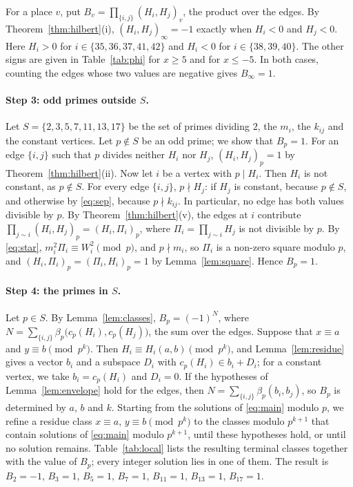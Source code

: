 \documentclass[11pt]{article}
\begin{document}
For a place $v$, put $B_v=\prod_{\{i,j\}}(H_i,H_j)_v$, the product over the edges. By Theorem~\ref{thm:hilbert}(i), $(H_i,H_j)_\infty=-1$ exactly when $H_i<0$ and $H_j<0$. Here $H_i>0$ for $i\in\{35,\allowbreak 36,\allowbreak 37,\allowbreak 41,\allowbreak 42\}$ and $H_i<0$ for $i\in\{38,\allowbreak 39,\allowbreak 40\}$. The other signs are given in Table~\ref{tab:phi} for $x\geq5$ and for $x\leq-5$. In both cases, counting the edges whose two values are negative gives $B_\infty=1$.

\paragraph{Step 3: odd primes outside $S$.} Let $S=\{2,3,5,7,11,13,17\}$ be the set of primes dividing $2$, the $m_{i}$, the $k_{ij}$ and the constant vertices. Let $p\notin S$ be an odd prime; we show that $B_p=1$. For an edge $\{i,j\}$ such that $p$ divides neither $H_i$ nor $H_j$, $(H_i,H_j)_p=1$ by Theorem~\ref{thm:hilbert}(ii). Now let $i$ be a vertex with $p\mid H_i$. Then $H_i$ is not constant, as $p\notin S$. For every edge $\{i,j\}$, $p\nmid H_j$: if $H_j$ is constant, because $p\notin S$, and otherwise by \eqref{eq:sep}, because $p\nmid k_{ij}$. In particular, no edge has both values divisible by $p$. By Theorem~\ref{thm:hilbert}(v), the edges at $i$ contribute $\prod_{j\sim i}(H_i,H_j)_p=(H_i,\Pi_i)_p$, where $\Pi_i=\prod_{j\sim i}H_j$ is not divisible by $p$. By \eqref{eq:star}, $m_i^2\Pi_i\equiv W_i^2\pmod p$, and $p\nmid m_i$, so $\Pi_i$ is a non-zero square modulo $p$, and $(H_i,\Pi_i)_p=(\Pi_i,H_i)_p=1$ by Lemma~\ref{lem:square}. Hence $B_p=1$.

\paragraph{Step 4: the primes in $S$.} Let $p\in S$. By Lemma~\ref{lem:classes}, $B_p=(-1)^{N}$, where $N=\sum_{\{i,j\}}\beta_p\bigl(c_p(H_i),c_p(H_j)\bigr)$, the sum over the edges. Suppose that $x\equiv a$ and $y\equiv b\pmod{p^k}$. Then $H_i\equiv H_i(a,b)\pmod{p^k}$, and Lemma~\ref{lem:residue} gives a vector $b_i$ and a subspace $D_i$ with $c_p(H_i)\in b_i+D_i$; for a constant vertex, we take $b_i=c_p(H_i)$ and $D_i=0$. If the hypotheses of Lemma~\ref{lem:envelope} hold for the edges, then $N=\sum_{\{i,j\}}\beta_p(b_i,b_j)$, so $B_p$ is determined by $a$, $b$ and $k$. Starting from the solutions of \eqref{eq:main} modulo $p$, we refine a residue class $x\equiv a$, $y\equiv b\pmod{p^k}$ to the classes modulo $p^{k+1}$ that contain solutions of \eqref{eq:main} modulo $p^{k+1}$, until these hypotheses hold, or until no solution remains. Table~\ref{tab:local} lists the resulting terminal classes together with the value of $B_p$; every integer solution lies in one of them. The result is $B_{2}=-1$, $B_{3}=1$, $B_{5}=1$, $B_{7}=1$, $B_{11}=1$, $B_{13}=1$, $B_{17}=1$.
\end{document}
